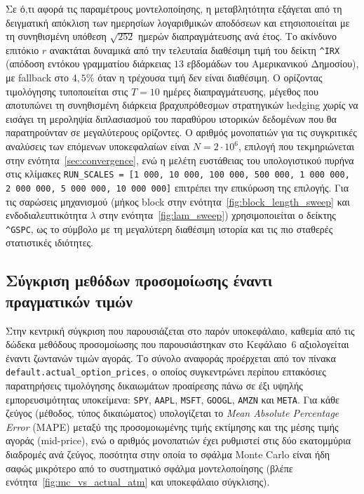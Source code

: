 \documentclass[12pt]{article}
\begin{document}
Σε ό,τι αφορά τις παραμέτρους μοντελοποίησης, η μεταβλητότητα εξάγεται από τη δειγματική απόκλιση των ημερησίων λογαριθμικών αποδόσεων και ετησιοποιείται με τη συνηθισμένη υπόθεση $\sqrt{252}$ ημερών διαπραγμάτευσης ανά έτος. Το ακίνδυνο επιτόκιο $r$ ανακτάται δυναμικά από την τελευταία διαθέσιμη τιμή του δείκτη \texttt{\^{}IRX} (απόδοση εντόκου γραμματίου διάρκειας $13$ εβδομάδων του Αμερικανικού Δημοσίου), με fallback στο $4{,}5\%$ όταν η τρέχουσα τιμή δεν είναι διαθέσιμη. Ο ορίζοντας τιμολόγησης τυποποιείται στις $T = 10$ ημέρες διαπραγμάτευσης, μέγεθος που αποτυπώνει τη συνηθισμένη διάρκεια βραχυπρόθεσμων στρατηγικών hedging χωρίς να εισάγει τη μεροληψία διπλασιασμού του παραθύρου ιστορικών δεδομένων που θα παρατηρούνταν σε μεγαλύτερους ορίζοντες. Ο αριθμός μονοπατιών για τις συγκριτικές αναλύσεις των επόμενων υποκεφαλαίων είναι $N = 2 \cdot 10^6$, επιλογή που τεκμηριώνεται στην ενότητα~\ref{sec:convergence}, ενώ η μελέτη ευστάθειας του υπολογιστικού πυρήνα στις κλίμακες \texttt{RUN\_SCALES = [1\,000, 10\,000, 100\,000, 500\,000, 1\,000\,000, 2\,000\,000, 5\,000\,000, 10\,000\,000]} επιτρέπει την επικύρωση της επιλογής. Για τις σαρώσεις μηχανισμού (μήκος block στην ενότητα~\ref{fig:block_length_sweep} και ενδοδιαλειπτικότητα $\lambda$ στην ενότητα~\ref{fig:lam_sweep}) χρησιμοποιείται ο δείκτης \texttt{\^{}GSPC}, ως το σύμβολο με τη μεγαλύτερη διαθέσιμη ιστορία και τις πιο σταθερές στατιστικές ιδιότητες.

\subsection{Σύγκριση μεθόδων προσομοίωσης έναντι πραγματικών τιμών}

Στην κεντρική σύγκριση που παρουσιάζεται στο παρόν υποκεφάλαιο, καθεμία από τις δώδεκα μεθόδους προσομοίωσης που παρουσιάστηκαν στο Κεφάλαιο~6 αξιολογείται έναντι ζωντανών τιμών αγοράς. Το σύνολο αναφοράς προέρχεται από τον πίνακα \texttt{default.actual\_option\_prices}, ο οποίος συγκεντρώνει περίπου επτακόσιες παρατηρήσεις τιμολόγησης δικαιωμάτων προαίρεσης πάνω σε έξι υψηλής εμπορευσιμότητας υποκείμενα: \texttt{SPY}, \texttt{AAPL}, \texttt{MSFT}, \texttt{GOOGL}, \texttt{AMZN} και \texttt{META}. Για κάθε ζεύγος (μέθοδος, τύπος δικαιώματος) υπολογίζεται το \emph{Mean Absolute Percentage Error} (MAPE) μεταξύ της προσομοιωμένης τιμής εκτίμησης και της μέσης τιμής αγοράς (mid-price), ενώ ο αριθμός μονοπατιών έχει ρυθμιστεί στις δύο εκατομμύρια διαδρομές ανά ζεύγος, ποσότητα στην οποία το σφάλμα Monte Carlo είναι ήδη σαφώς μικρότερο από το συστηματικό σφάλμα μοντελοποίησης (βλέπε ενότητα~\ref{fig:mc_vs_actual_atm} και υποκεφάλαιο σύγκλισης).
\end{document}
